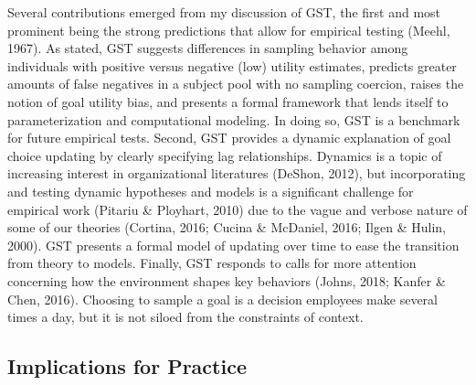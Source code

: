 \documentclass[english,,man]{apa6}
\theoremstyle{definition}
\theoremstyle{definition}
\theoremstyle{definition}
\theoremstyle{remark}
\begin{document}
Several contributions emerged from my discussion of GST, the first and
most prominent being the strong predictions that allow for empirical
testing (Meehl, 1967). As stated, GST suggests differences in sampling
behavior among individuals with positive versus negative (low) utility
estimates, predicts greater amounts of false negatives in a subject pool
with no sampling coercion, raises the notion of goal utility bias, and
presents a formal framework that lends itself to parameterization and
computational modeling. In doing so, GST is a benchmark for future
empirical tests. Second, GST provides a dynamic explanation of goal
choice updating by clearly specifying lag relationships. Dynamics is a
topic of increasing interest in organizational literatures (DeShon,
2012), but incorporating and testing dynamic hypotheses and models is a
significant challenge for empirical work (Pitariu \& Ployhart, 2010) due
to the vague and verbose nature of some of our theories (Cortina, 2016;
Cucina \& McDaniel, 2016; Ilgen \& Hulin, 2000). GST presents a formal
model of updating over time to ease the transition from theory to
models. Finally, GST responds to calls for more attention concerning how
the environment shapes key behaviors (Johns, 2018; Kanfer \& Chen,
2016). Choosing to sample a goal is a decision employees make several
times a day, but it is not siloed from the constraints of context.

\hypertarget{implications-for-practice}{%
\subsection{Implications for Practice}\label{implications-for-practice}}
\end{document}

